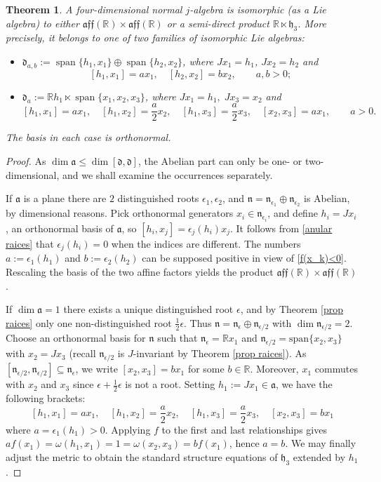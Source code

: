 \documentclass[12pt, twoside]{amsart}
\def\d{\mathfrak{d}}
\def\h{\mathfrak{h}}
\def\n{\mathfrak{n}}
\def\a{\mathfrak{a}}
\def\R{\mathbb{R}}
\def\aff{\mathfrak{aff}}
\newcommand{\op}[1]{\operatorname{#1}}
\newtheorem{thm}[definition]{Theorem}
\theoremstyle{definition}
\begin{document}
\begin{thm} \label{normal 4}
A four-dimensional normal $j$-algebra is isomorphic (as a Lie algebra) to either $\aff(\R)\times \aff(\R)$ or a semi-direct product $\R\ltimes \h_3$. More precisely, it belongs to one of two families of isomorphic Lie algebras:
\begin{itemize}
    \item[i)] $\d_{a,b}:=\op{span}\{h_1, x_1\}\oplus\op{span}\{h_2, x_2\}$, where $Jx_{1}=h_1$, $Jx_{2}=h_2$ and 
$$ [h_1, x_1]=a x_1, \quad [h_2,x_2]=b x_2, \qquad a,b> 0;$$
 \item[ii)] $\d_{a}:=\R h_1\ltimes \op{span}\{x_1 , x_2, x_3\}$, where $Jx_1=h_1 , \; Jx_3 = x_2$ and 
$$ [h_1,x_1]=ax_1, \quad
    [h_1,x_2]=\frac{a}{2}x_2, \quad
    [h_1,x_3]= \frac{a}{2}x_3, \quad
    [x_2, x_3]=ax_1, \qquad a> 0.$$
\end{itemize}
The basis in each case is orthonormal.
\end{thm}

\begin{proof}
As $\dim \a\leq \dim [\d, \d]$, the Abelian part can only be one- or two-dimensional, and we shall examine the occurrences separately.\par 
\quad If  $\a$ is a plane there are $2$ distinguished roots $\epsilon_1, \epsilon_2$, and $\n = \n_{\epsilon_1} \oplus \n_{\epsilon_2}$ is Abelian, by dimensional reasons. Pick orthonormal generators $x_i\in \n_{\epsilon_i}$, and define $h_i= Jx_i$, an orthonormal basis of $\a$, so 
$ [h_i, x_j]=\epsilon_j(h_i)x_j$. 
It follows from \eqref{anular raices} that $\epsilon_j(h_i)=0$ when the indices are different. The numbers $a:=\epsilon_{1}(h_1)$ and $b:=\epsilon_{2}(h_2)$ can be supposed positive in view of \eqref{f(x_k)<0}. 
Rescaling the basis of the two affine factors yields the product $\aff(\R)\times \aff(\R)$.
\par
\quad  If $\dim \mathfrak{a} = 1$ there exists a unique distinguished root $\epsilon$, and by Theorem \ref{prop raices} only one non-distinguished root $\frac12\epsilon$. Thus $\n= \n_{\epsilon} \oplus \n_{\epsilon/2}$ with $\dim \n_{\epsilon/2} =2$. 
    Choose an orthonormal basis for $\n$ such that $\n_{\epsilon}= \R x_1$ and $\n_{\epsilon/2}= \text{span}\{x_2, x_3\}$ with $x_2=Jx_3$ (recall $\n_{\epsilon/2}$ is $J$-invariant by Theorem \ref{prop raices}). As $[\n_{\epsilon/2},\n_{\epsilon/2}] \subseteq \n_{\epsilon}$, we write $[x_2,x_3]=b x_1$ for some $b \in \R$. Moreover, $x_1$ commutes with $x_2$ and $x_3$ since $\epsilon+\frac12 \epsilon$ is not a root. Setting $h_1:=Jx_1\in \a$, we have the following brackets:
$$
    [h_1,x_1]= ax_1, \quad
    [h_1,x_2]=\frac{a}{2}x_2, \quad
    [h_1,x_3]=\frac{a}{2}x_3, \quad 
    [x_2,x_3]=b x_1
$$
where $a = \epsilon_{1}(h_1) > 0$. Applying $f$ to the first and last relationships gives  $a f(x_1) = \omega(h_1,x_1) = 1 = \omega(x_2,x_3) = b f(x_1)$, hence $a=b$. We may finally adjust the metric to obtain the standard structure equations of $\h_3$ extended by $h_1$.
\end{proof}
\end{document}
